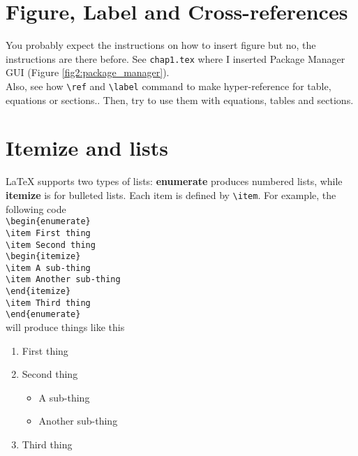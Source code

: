 \cleardoublepage

 \section{Figure, Label and Cross-references}
 You probably expect the instructions on how to insert figure but no, the instructions are there before. See
 \verb+chap1.tex+ where I inserted Package Manager GUI (Figure \ref{fig2:package_manager}).\\
 
 Also, see how \verb+\ref+ and \verb+\label+ command to make hyper-reference for table, equations or sections.. Then, try to use them with equations, tables and sections.

\section{Itemize and lists}
{\LaTeX} supports two types of lists: \textbf{enumerate} produces numbered lists, while \textbf{itemize} is for bulleted lists. Each item is defined by \verb+\item+. For example, the following code\\

\verb+\begin{enumerate}+\\
\indent\verb+\item First thing+\\
 \indent\verb+\item Second thing+\\
 \indent\verb+\begin{itemize}+\\
 \indent\verb+\item A sub-thing+\\
 \indent\verb+\item Another sub-thing+\\
 \indent\verb+\end{itemize}+\\
\indent\verb+\item Third thing+\\
\indent\verb+\end{enumerate}+\\
 
 \noindent will produce things like this\\
 \begin{enumerate}
     \item First thing
     \item Second thing
     \begin{itemize}
     \item A sub-thing
     \item Another sub-thing
     \end{itemize}
     \item Third thing
     \end{enumerate}

